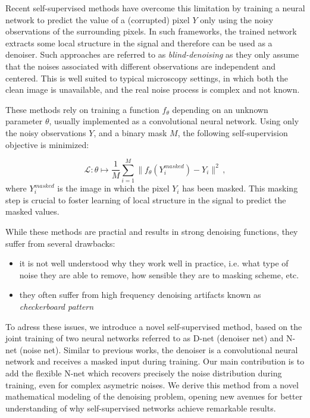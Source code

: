 \documentclass{article}
\begin{document}
Recent self-supervised methods have overcome this limitation \cite{batson2019noise2self,krull2018noise2void} by training a neural network to predict the value of a (corrupted) pixel $Y$ only using the noisy observations of the surrounding pixels. In such frameworks, the trained network extracts some local structure in the signal and therefore can be used as a denoiser. Such approaches are referred to as \textit{blind-denoising} as they only assume that the noises associated with different observations are independent and centered. This is well suited to typical microscopy settings, in which both the clean image is unavailable, and the real noise process is complex and not known.

These methods rely on training a function $f_\theta$ depending on an unknown parameter $\theta$, usually implemented as a convolutional neural network. Using only the noisy observations $Y$, and a binary mask $M$, the following self-supervision objective is minimized:

$$\mathcal{L}: \theta\mapsto \frac{1}{M}\sum_{i=1}^M \|f_\theta(Y^{masked}_i) - Y_i\|^2\,, $$
where $Y^{masked}_i$ is the image in which the pixel $Y_i$ has been masked. This masking step is crucial to foster learning of local structure in the signal to predict the masked values.

While these methods are practial and results in strong denoising functions, they suffer from several drawbacks:

\begin{itemize}
  \item it is not well understood why they work well in practice, i.e. what type of noise they are able to remove, how sensible they are to masking scheme, etc.
  \item they often suffer from high frequency denoising artifacts known as \textit{checkerboard pattern}
\end{itemize}

To adress these issues, we introduce a novel self-supervised method, based on the joint training of two neural networks referred to as D-net (denoiser net) and N-net (noise net). Similar to previous works, the denoiser is a convolutional neural network and receives a masked input during training. Our main contribution is to add the flexible N-net
which recovers precisely the noise distribution during training, even for complex asymetric noises. We derive this method from a novel mathematical modeling of the denoising problem, opening new avenues for better understanding of why self-supervised networks achieve remarkable results.
\end{document}
